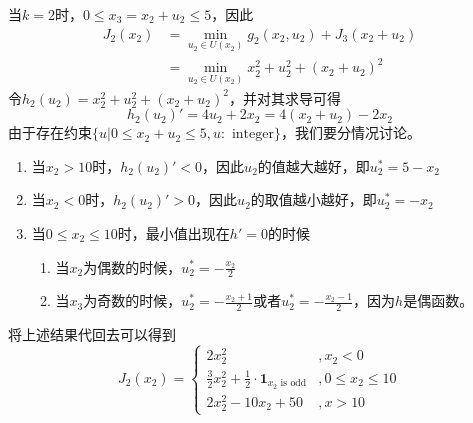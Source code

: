 \documentclass{article}
\begin{document}
\begin{enumerate}[(a)]
            当$k=2$时，$0\leq x_3=x_2+u_2\leq 5$，因此
            \begin{equation}
                \begin{split}
                    J_2(x_2) &=\min_{u_2\in U(x_2)}g_2(x_2,u_2)+J_3(x_2+u_2)\\
                    &=\min_{u_2\in U(x_2)}x_2^2+u_2^2+(x_2+u_2)^2
                \end{split}
            \end{equation}
            令$h_2(u_2)=x_2^2+u_2^2+(x_2+u_2)^2$，并对其求导可得
            \begin{equation}
                h_2(u_2)'=4u_2+2x_2=4(x_2+u_2)-2x_2
            \end{equation}
            由于存在约束$\{u|0\leq x_2+u_2\leq 5, u:\text{ integer}\}$，我们要分情况讨论。
            \begin{enumerate}
                \item 当$x_2>10$时，$h_2(u_2)'<0$，因此$u_2$的值越大越好，即$u_2^*=5-x_2$
                \item 当$x_2<0$时，$h_2(u_2)'>0$，因此$u_2$的取值越小越好，即$u_2^*=-x_2$
                \item 当$0\leq x_2\leq 10$时，最小值出现在$h'=0$的时候
                    \begin{enumerate}
                        \item 当$x_2$为偶数的时候，$u_2^*=-\frac{x_2}{2}$
                        \item 当$x_3$为奇数的时候，$u_2^*=-\frac{x_2+1}{2}$或者$u_2^*=-\frac{x_2-1}{2}$，因为$h$是偶函数。
                    \end{enumerate}
            \end{enumerate}
            将上述结果代回去可以得到
            \begin{equation}
                J_2(x_2)=
                \begin{cases}
                    2x_2^2 & ,x_2<0\\
                    \frac{3}{2}x_2^2+\frac{1}{2}\cdot\bm{1}_{x_2\text{ is odd} } &, 0\leq x_2\leq 10\\
                    2x_2^2-10x_2+50 &,x>10
                \end{cases}
            \end{equation}


\end{enumerate}
\end{document}
